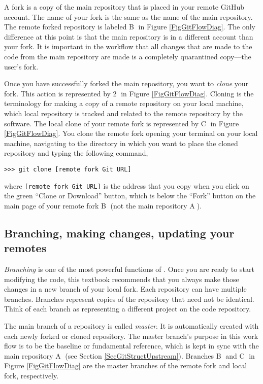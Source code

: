     A fork is a copy of the main repository that is placed in your remote GitHub account. The name of your fork is the same as the name of the main repository. The remote forked repository is labeled \textcircled{B} in Figure \ref{FigGitFlowDiag}. The only difference at this point is that the main repository is in a different account than your fork. It is important in the \git workflow that all changes that are made to the code from the main repository are made is a completely quarantined copy---the user's fork.

    Once you have successfully forked the main repository, you want to \textit{clone} your fork. This action is represented by \textcircled{2} in Figure \ref{FigGitFlowDiag}. Cloning is the \git terminology for making a copy of a remote repository on your local machine, which local repository is tracked and related to the remote repository by the \git software. The local clone of your remote fork is represented by \textcircled{C} in Figure \ref{FigGitFlowDiag}. You clone the remote fork opening your terminal on your local machine, navigating to the directory in which you want to place the cloned repository and typing the following command,
    \begin{lstlisting}[frame=single]
      >>> git clone [remote fork Git URL]
    \end{lstlisting}
    where \texttt{[remote fork Git URL]} is the address that you copy when you click on the green ``Clone or Download'' button, which is below the ``Fork'' button on the main page of your remote fork \textcircled{B} (not the main repository \textcircled{A}).


  \subsection{Branching, making changes, updating your remotes}\label{SecGitStructUpdate}

    \textit{Branching} is one of the most powerful functions of \git. Once you are ready to start modifying the code, this textbook recommends that you always make those changes in a new branch of your local fork. Each repository can have multiple branches. Branches represent copies of the repository that need not be identical. Think of each branch as representing a different project on the code repository.

    The main branch of a repository is called \textit{master}. It is automatically created with each newly forked or cloned repository. The master branch's purpose in this \git work flow is to be the baseline or fundamental reference, which is kept in sync with the main repository \textcircled{A} (see Section \ref{SecGitStructUpstream}). Branches \textcircled{B} and \textcircled{C} in Figure \ref{FigGitFlowDiag} are the master branches of the remote fork and local fork, respectively.

